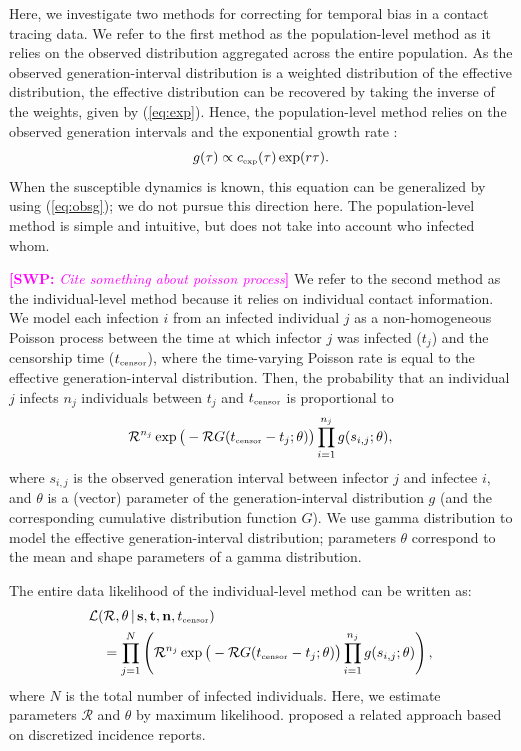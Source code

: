\documentclass[12pt]{article}
\newcommand{\eref}[1]{(\ref{eq:#1})}
\newcommand{\RR}{\ensuremath{{\mathcal R}}}
\newcommand{\tsub}[2]{#1_{{\textrm{\tiny #2}}}}
\newcommand{\comment}[3]{\textcolor{#1}{\textbf{[#2: }\textsl{#3}\textbf{]}}}
\newcommand{\swp}[1]{\comment{magenta}{SWP}{#1}}
\begin{document}
Here, we investigate two methods for correcting for temporal bias in a contact tracing data.
We refer to the first method as the population-level method as it relies on the observed distribution aggregated across the entire population.
As the observed generation-interval distribution is a weighted distribution of the effective distribution, the effective distribution can be recovered by taking the inverse of the weights, given by \eref{exp}.
Hence, the population-level method relies on the observed generation intervals and the exponential growth rate \citep{tomba2010some, nishiura2010time, britton2019estimation}:
\begin{equation}
g(\tau) \propto \tsub{c}{exp}(\tau) \exp(r\tau).
\end{equation}
When the susceptible dynamics is known, this equation can be generalized by using \eref{obsg}; we do not pursue this direction here.
The population-level method is simple and intuitive, but does not take into account who infected whom.

\swp{Cite something about poisson process}
We refer to the second method as the individual-level method because it relies on individual contact information.
We model each infection $i$ from an infected individual $j$ as a non-homogeneous Poisson process between the time at which infector $j$ was infected ($t_j$) and the censorship time ($\tsub{t}{censor}$), where the time-varying Poisson rate is equal to the effective generation-interval distribution.
Then, the probability that an individual $j$ infects $n_j$ individuals between $t_j$ and $\tsub{t}{censor}$ is proportional to
\begin{equation}
\RR^{n_j} \exp \big(- \RR G(\tsub{t}{censor} - t_j ;\theta) \big) \prod_{i=1}^{n_j} g(s_{i, j}; \theta),
\end{equation}
where $s_{i,j}$ is the observed generation interval between infector $j$ and infectee $i$, and $\theta$ is a (vector) parameter of the generation-interval distribution $g$ (and the corresponding cumulative distribution function $G$).
We use gamma distribution to model the effective generation-interval distribution;
parameters $\theta$ correspond to the mean and shape parameters of a gamma distribution.

The entire data likelihood of the individual-level method can be written as:
\begin{equation}
\begin{aligned}
&\mathcal{L}(\RR, \theta\,|\, \mathbf{s}, \mathbf{t}, \mathbf{n}, \tsub{t}{censor})\\
&\quad=\prod_{j=1}^N \left(\RR^{n_j} \exp \big(- \RR G(\tsub{t}{censor} - t_j ;\theta) \big) \prod_{i=1}^{n_j} g(s_{i, j}; \theta) \right),
\end{aligned}
\end{equation}
where $N$ is the total number of infected individuals.
Here, we estimate parameters $\RR$ and $\theta$ by maximum likelihood.
\cite{forsberg2008likelihood} proposed a related approach based on discretized incidence reports.
\end{document}
